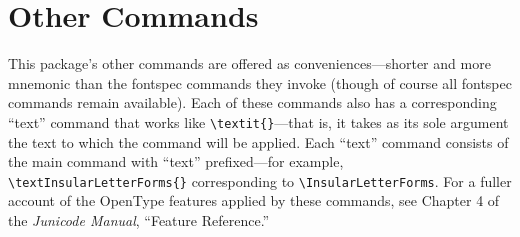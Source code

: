 \documentclass[12pt]{article}
\newcommand{\fspec}{{\sffamily fontspec}}
\begin{document}
\section{Other Commands}

This package's other commands are offered as conveniences---shorter and more
mnemonic than the {\fspec} commands they invoke (though of course all {\fspec} commands
remain available). Each of these commands
also has a corresponding “text” command that works like 
{\verb|\textit{}|}—that is, it takes
as its sole argument the text to which the command will be applied. Each “text” command
consists of the main command with “text” prefixed—for example,
{\verb|\textInsularLetterForms{}|}
corresponding to {\verb|\InsularLetterForms|}.  For a fuller account of the OpenType features
applied by these commands, see Chapter 4 of the \textit{Junicode Manual}, “Feature Reference.”
\end{document}
